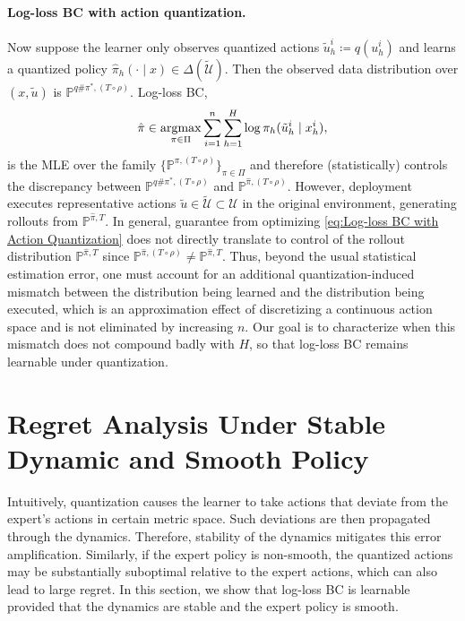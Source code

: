 \documentclass{article}
\let\oldparagraph\paragraph
\renewcommand{\paragraph}[1]{\oldparagraph{#1.}}
\begin{document}
\paragraph{Log-loss BC with action quantization}
Now suppose the learner only observes quantized actions $\tilde u_h^i \coloneqq  q(u_h^i)$ and learns a
quantized policy $\hat\pi_h(\cdot\mid x)\in\Delta(\tilde{\mathcal U})$.
Then the observed data distribution over $(x,\tilde u)$ is $\mathbb P^{q\#\pi^*,(T\circ\rho)}$.
Log-loss BC,
\begin{equation}\label{eq:Log-loss BC with Action Quantization}
    \hat \pi \in \mathop{\mathrm{argmax}}_{\pi \in \Pi}\sum_{i=1}^n\sum_{h=1}^H \log \pi_h(\tilde u_h^i\mid x_h^i),
\end{equation}
is the MLE over the family $\{\mathbb P^{\pi,(T\circ\rho)}\}_{\pi\in\Pi}$ and therefore (statistically)
controls the discrepancy between $\mathbb P^{q\#\pi^*,(T\circ\rho)}$ and $\mathbb P^{\hat\pi,(T\circ\rho)}$. However, deployment executes representative actions $\tilde u\in\tilde{\mathcal U}\subset\mathcal U$ in the original
environment, generating rollouts from $\mathbb P^{\hat\pi,T}$.
In general, guarantee from optimizing \cref{eq:Log-loss BC with Action Quantization} does not directly translate to
control of the rollout distribution $\mathbb P^{\hat\pi,T}$ since $\mathbb P^{\hat \pi, (T\circ \rho)}\neq \mathbb P^{\hat \pi, T}$.
Thus, beyond the usual statistical estimation error, one must account for an additional
quantization-induced mismatch between the distribution being learned and the distribution being executed,
which is an approximation effect of discretizing a continuous action space and is not eliminated by increasing $n$. Our goal is to characterize when this mismatch does not
compound badly with $H$, so that log-loss BC remains learnable under quantization.





\section{Regret Analysis Under Stable Dynamic and Smooth Policy}\label{sec:upper_bound_with_stability_and_smoothness}
Intuitively, quantization causes the learner to take actions that deviate from the expert's actions in certain metric space. Such deviations are then propagated through the dynamics. Therefore, stability of the dynamics mitigates this error amplification. Similarly, if the expert policy is non-smooth, the quantized actions may be substantially suboptimal relative to the expert actions, which can also lead to large regret. In this section, we show that log-loss BC is learnable provided that the dynamics are stable and the expert policy is smooth.
\end{document}
